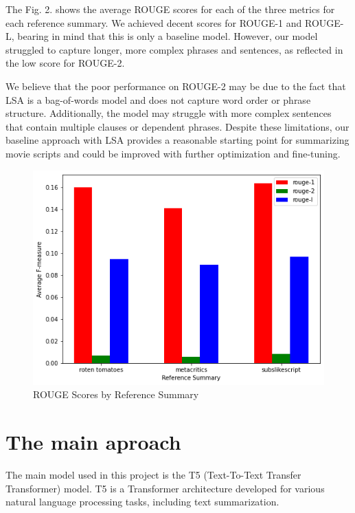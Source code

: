 \documentclass[fleqn,moreauthors,10pt]{ds_report}
\begin{document}
The Fig. 2. shows the average ROUGE scores for each of the three metrics for each reference summary. We achieved decent scores for ROUGE-1 and ROUGE-L, bearing in mind that this is only a baseline model.  However, our model struggled to capture longer, more complex phrases and sentences, as reflected in the low score for ROUGE-2.

We believe that the poor performance on ROUGE-2 may be due to the fact that LSA is a bag-of-words model and does not capture word order or phrase structure. Additionally, the model may struggle with more complex sentences that contain multiple clauses or dependent phrases. Despite these limitations, our baseline approach with LSA provides a reasonable starting point for summarizing movie scripts and could be improved with further optimization and fine-tuning. 

\begin{figure}[h]
\begin{center}
\includegraphics[width=1.0\columnwidth]{rouge_scores.png}
\end{center}
\caption{ROUGE Scores by Reference Summary}
\label{fig1}
\end{figure}

\section*{The main aproach}

The main model used in this project is the T5 (Text-To-Text Transfer Transformer) model. T5 is a Transformer architecture developed for various natural language processing tasks, including text summarization.
\end{document}
